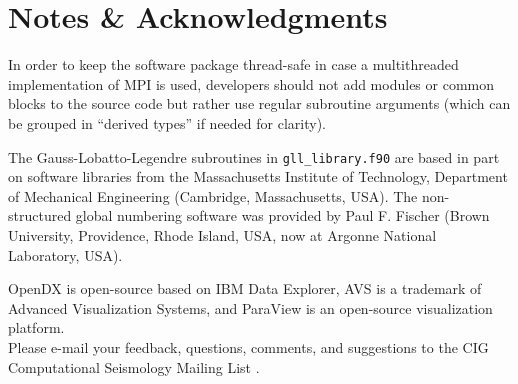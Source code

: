 
\chapter*{Notes \& Acknowledgments}

In order to keep the software package thread-safe in case a multithreaded
implementation of MPI is used, developers should not add modules or
common blocks to the source code but rather use regular subroutine
arguments (which can be grouped in ``derived types'' if needed for
clarity).

The Gauss-Lobatto-Legendre subroutines in \texttt{gll\_library.f90}
are based in part on software libraries from the Massachusetts Institute
of Technology, Department of Mechanical Engineering (Cambridge, Massachusetts,
USA). The non-structured global numbering software was provided by
Paul F. Fischer (Brown University, Providence, Rhode Island, USA,
now at Argonne National Laboratory, USA).

OpenDX  is open-source
based on IBM Data Explorer, AVS 
is a trademark of Advanced Visualization Systems, and ParaView 
is an open-source visualization platform.\\

Please e-mail your feedback, questions, comments, and suggestions
to the CIG Computational Seismology Mailing List .

